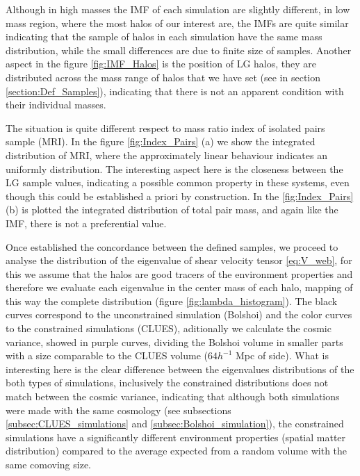 \documentclass[usenatbib]{latex/mn2e}
\begin{document}
Although in high masses the IMF of each simulation are slightly different, 
in low mass region, where the most halos of our interest are, the IMFs are 
quite similar indicating that the sample of halos in each simulation have 
the same mass distribution, while the small differences are due to finite 
size of samples. Another aspect in the figure \ref{fig:IMF_Halos} is the 
position of LG halos, they are distributed across the mass range of halos 
that we have set (see in section \ref{section:Def_Samples}), indicating 
that there is not an apparent condition with their individual masses.



The situation is quite different respect to mass ratio index of isolated 
pairs sample (MRI). In the figure \ref{fig:Index_Pairs} (a) we show the 
integrated distribution of MRI, where the approximately linear behaviour 
indicates an uniformly distribution. The interesting aspect here is the 
closeness between the LG sample values, indicating a possible common 
property in these systems, even though this could be established a priori 
by construction. In the \ref{fig:Index_Pairs} (b) is plotted the 
integrated distribution of total pair mass, and again like the IMF, there 
is not a preferential value.


Once established the concordance between the defined samples, we proceed 
to analyse the distribution of the eigenvalue of shear velocity tensor 
\ref{eq:V_web}, for this we assume that the halos are good tracers of the 
environment properties and therefore we evaluate each eigenvalue in the 
center mass of each halo, mapping of this way the complete distribution 
(figure \ref{fig:lambda_histogram}). The black curves correspond to the 
unconstrained simulation (Bolshoi) and the color curves to the constrained 
simulations (CLUES), aditionally we calculate the cosmic variance, showed 
in purple curves, dividing the Bolshoi volume in smaller parts with a size 
comparable to the CLUES volume ($64 h^{-1 }$ Mpc of side). What is 
interesting here is the clear difference between the eigenvalues 
distributions of the both types of simulations, inclusively the 
constrained distributions does not match between the cosmic variance, 
indicating that although both simulations were made with the same cosmology 
(see subsections \ref{subsec:CLUES_simulations} and 
\ref{subsec:Bolshoi_simulation}), the constrained simulations have a 
significantly different environment properties (spatial matter distribution) 
compared to the average expected from a random volume with the same 
comoving size.
\end{document}
